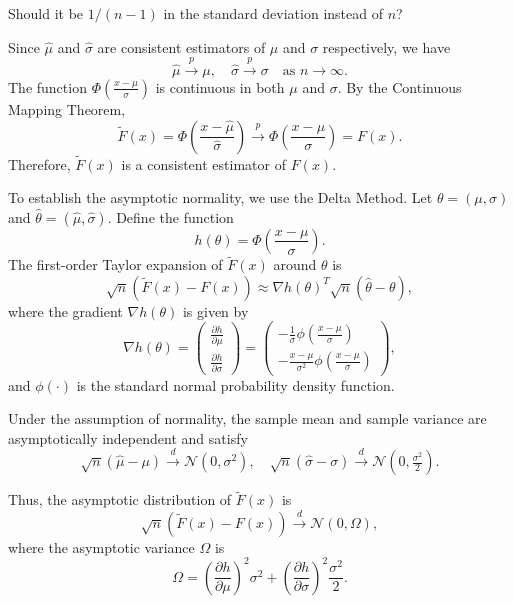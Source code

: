 \documentclass{article}
\newenvironment{colorparagraph}[1]{\par\color{#1}}{\par}
\begin{document}
\begin{colorparagraph}{tacolor}
Should it be $1 / (n - 1)$ in the standard deviation instead of $n$?
\end{colorparagraph}

Since \( \hat{\mu} \) and \( \hat{\sigma} \) are consistent estimators of \( \mu \) and \( \sigma \) respectively, we have
\[
\hat{\mu} \xrightarrow{p} \mu, \quad \hat{\sigma} \xrightarrow{p} \sigma \quad \text{as } n \to \infty.
\]
The function \( \Phi\left( \frac{x - \mu}{\sigma} \right) \) is continuous in both \( \mu \) and \( \sigma \). By the Continuous Mapping Theorem,
\[
\tilde{F}(x) = \Phi\left( \frac{x - \hat{\mu}}{\hat{\sigma}} \right) \xrightarrow{p} \Phi\left( \frac{x - \mu}{\sigma} \right) = F(x).
\]
Therefore, \( \tilde{F}(x) \) is a consistent estimator of \( F(x) \).

To establish the asymptotic normality, we use the Delta Method. Let \( \theta = (\mu, \sigma) \) and \( \hat{\theta} = (\hat{\mu}, \hat{\sigma}) \). Define the function
\[
h(\theta) = \Phi\left( \frac{x - \mu}{\sigma} \right).
\]
The first-order Taylor expansion of \( \tilde{F}(x) \) around \( \theta \) is
\[
\sqrt{n} \left( \tilde{F}(x) - F(x) \right) \approx \nabla h(\theta)^T \sqrt{n} (\hat{\theta} - \theta),
\]
where the gradient \( \nabla h(\theta) \) is given by
\[
\nabla h(\theta) = \begin{pmatrix}
\displaystyle \frac{\partial h}{\partial \mu} \\[2ex]
\displaystyle \frac{\partial h}{\partial \sigma}
\end{pmatrix} = \begin{pmatrix}
\displaystyle -\frac{1}{\sigma} \phi\left( \frac{x - \mu}{\sigma} \right) \\[2ex]
\displaystyle -\frac{x - \mu}{\sigma^2} \phi\left( \frac{x - \mu}{\sigma} \right)
\end{pmatrix},
\]
and \( \phi(\cdot) \) is the standard normal probability density function.

Under the assumption of normality, the sample mean and sample variance are asymptotically independent and satisfy
\[
\sqrt{n} (\hat{\mu} - \mu) \xrightarrow{d} \mathcal{N}\left( 0, \sigma^2 \right), \quad
\sqrt{n} (\hat{\sigma} - \sigma) \xrightarrow{d} \mathcal{N}\left( 0, \tfrac{\sigma^2}{2} \right).
\]

Thus, the asymptotic distribution of \( \tilde{F}(x) \) is
\[
\sqrt{n} \left( \tilde{F}(x) - F(x) \right) \xrightarrow{d} \mathcal{N}\left( 0, \Omega \right),
\]
where the asymptotic variance \( \Omega \) is
\[
\Omega = \left( \frac{\partial h}{\partial \mu} \right)^2 \sigma^2 + \left( \frac{\partial h}{\partial \sigma} \right)^2 \frac{\sigma^2}{2}.
\]
\end{document}
